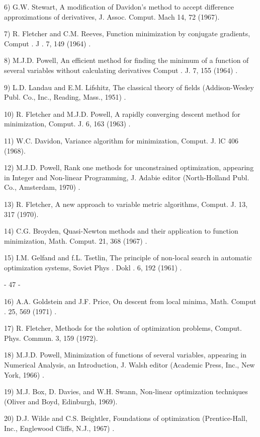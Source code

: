  6) G.W. Stewart, A modification of Davidon's method to accept difference approximations of derivatives, J. Assoc. Comput. Mach
        14, 72 (1967).
 
 7)  R. Fletcher and C.M. Reeves, Function minimization by conjugate
        gradients, Comput . J . 7, 149 (1964) .
 
 8) M.J.D. Powell, An efficient method for finding the minimum of a
        function of several variables without calculating derivatives
        Comput . J. 7, 155 (1964) .
 
 9) L.D. Landau and E.M. Lifshitz, The classical theory of fields
        (Addison-Wesley Publ. Co., Inc., Reading, Mass., 1951) .
 
10)  R. Fletcher and M.J.D. Powell, A rapidly converging descent method
        for minimization, Comput. J. 6, 163 (1963) .
 
11)  W.C. Davidon, Variance algorithm for minimization, Comput. J. lC
        406 (1968).
 
12) M.J.D. Powell, Rank one methods for unconstrained optimization,
        appearing in Integer and Non-linear Programming, J. Adabie
        editor (North-Holland Publ. Co., Amsterdam, 1970) .
 
13) R. Fletcher, A new approach to variable metric algorithms,
        Comput. J. 13, 317 (1970).
 
14) C.G. Broyden, Quasi-Newton methods and their application to function
        minimization, Math. Comput. 21, 368 (1967) .
 
15)  I.M. Gelfand and f.L. Tsetlin, The principle of non-local search
        in automatic optimization systems, Soviet Phys . Dokl . 6, 192
        (1961) .
 
 
                              - 47 -
 
 
16) A.A. Goldstein and J.F. Price, On descent from local minima, Math.
        Comput . 25, 569 (1971) .
 
17) R. Fletcher, Methods for the solution of optimization problems,
        Comput. Phys. Commun. 3, 159 (1972).
 
18)  M.J.D. Powell, Minimization of functions of several variables,
        appearing in Numerical Analysis, an Introduction, J. Walsh
        editor (Academic Press, Inc., New York, 1966) .
 
19)  M.J. Box, D. Davies, and W.H. Swann, Non-linear optimization
        techniques (Oliver and Boyd, Edinburgh, 1969).
 
20) D.J. Wilde and C.S. Beightler, Foundations of optimization
        (Prentice-Hall, Inc., Englewood Cliffs, N.J., 1967) .
 
